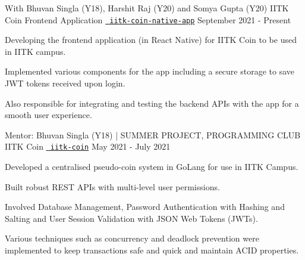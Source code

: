 

\begin{cventries}

\cventry
  {With Bhuvan Singla (Y18), Harshit Raj (Y20) and Somya Gupta (Y20)}
  {IITK Coin Frontend Application}
  {\texttt{\href{https://github.com/abhishekshree/iitk-coin-native-app}{\faGithub{} iitk-coin-native-app}}}
  {September 2021 - Present}
  {
    \begin{cvitems}
      \item Developing the frontend application (in React Native) for IITK Coin to be used in IITK campus.
      \item Implemented various components for the app including a secure storage to save JWT tokens received upon login.
      \item Also responsible for integrating and testing the backend APIs with the app for a smooth user experience.
    \end{cvitems}
  }
 \vspace{0.2cm}
  \cventry
  {Mentor: Bhuvan Singla (Y18) | SUMMER PROJECT, PROGRAMMING CLUB}
  {IITK Coin}
  {\texttt{\href{https://github.com/abhishekshree/iitk-coin}{\faGithub{} iitk-coin}}}
  {May 2021 - July 2021}
  {
    \begin{cvitems}
      \item Developed a centralised pseudo-coin system in GoLang for use in IITK Campus.
      \item Built robust REST APIs with multi-level user permissions.
      \item Involved Database Management, Password Authentication with Hashing and Salting and User Session Validation with JSON Web Tokens (JWTs).
      \item Various techniques such as concurrency and deadlock prevention were implemented to keep transactions safe and quick and maintain ACID properties.
    \end{cvitems}
  }
 \vspace{0.2cm}
  \cventry

\end{cventries}

